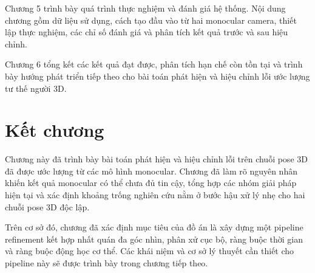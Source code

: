 \documentclass[../DoAn.tex]{subfiles}
\begin{document}
Chương 5 trình bày quá trình thực nghiệm và đánh giá hệ thống. Nội dung chương gồm dữ liệu sử dụng, cách tạo đầu vào từ hai monocular camera, thiết lập thực nghiệm, các chỉ số đánh giá và phân tích kết quả trước và sau hiệu chỉnh.

Chương 6 tổng kết các kết quả đạt được, phân tích hạn chế còn tồn tại và trình bày hướng phát triển tiếp theo cho bài toán phát hiện và hiệu chỉnh lỗi ước lượng tư thế người 3D.

\section*{Kết chương}

Chương này đã trình bày bài toán phát hiện và hiệu chỉnh lỗi trên chuỗi pose 3D đã được ước lượng từ các mô hình monocular. Chương đã làm rõ nguyên nhân khiến kết quả monocular có thể chưa đủ tin cậy, tổng hợp các nhóm giải pháp hiện tại và xác định khoảng trống nghiên cứu nằm ở bước hậu xử lý nhẹ cho hai chuỗi pose 3D độc lập.

Trên cơ sở đó, chương đã xác định mục tiêu của đồ án là xây dựng một pipeline refinement kết hợp nhất quán đa góc nhìn, phân xử cục bộ, ràng buộc thời gian và ràng buộc động học cơ thể. Các khái niệm và cơ sở lý thuyết cần thiết cho pipeline này sẽ được trình bày trong chương tiếp theo.
\end{document}
